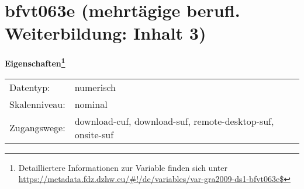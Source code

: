 
    \setcounter{footnote}{0}

    \vspace*{-1.8cm}
	\section{bfvt063e (mehrtägige berufl. Weiterbildung: Inhalt 3)}
	\label{section:bfvt063e}



    \vspace*{0.5cm}
    \noindent\textbf{Eigenschaften\footnote{Detailliertere Informationen zur Variable finden sich unter
		\url{https://metadata.fdz.dzhw.eu/\#!/de/variables/var-gra2009-ds1-bfvt063e$}}}\\
	\begin{tabularx}{\hsize}{@{}lX}
	Datentyp: & numerisch \\
	Skalenniveau: & nominal \\
	Zugangswege: &
	  download-cuf, 
	  download-suf, 
	  remote-desktop-suf, 
	  onsite-suf
 \\
    \end{tabularx}



